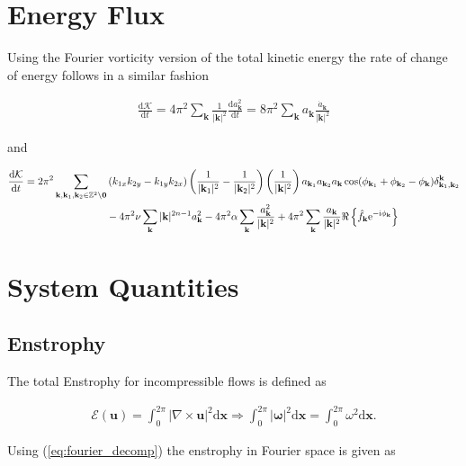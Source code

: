\documentclass[9pt]{article}
\newcommand{\der}[2]{\frac{\mathrm{d}#1}{\mathrm{d}#2}}          	 %
\newcommand{\ii}{\mathrm{i}}      								  %
\newcommand{\e}{\mathrm{e}}      								  %
\newcommand{\curl}[1]{\nabla \times {#1}}								%
\newcommand{\bfu}{\mathbf{u}}											%
\newcommand{\bfx}{\mathbf{x}}								%
\newcommand{\bfk}{\mathbf{k}}								%
\newcommand{\bfkn}[1]{\mathbf{k}_{#1}}								%
\begin{document}
\section{Energy Flux}

Using the Fourier vorticity version of the total kinetic energy the rate of change of energy follows in a similar fashion

\begin{align}
	\der{\mathcal{K}}{t} = 4\pi^2\sum_{\bfk}  \frac{1}{|\bfk|^2}\der{a_\bfk^2}{t} =8\pi^2\sum_{\bfk} a_\bfk \frac{\dot{a}_\bfk}{|\bfk|^2}
\end{align}

and 

\begin{align}
	\der{\mathcal{K}}{t} &= 2\pi^2	\sum_{\bfk, \mathbf{k}_1, \mathbf{k}_2\in \mathbb{Z}^2\setminus \mathbf{0}}\left(k_{1x}k_{2y} - k_{1y}k_{2x}\right) \left(\frac{1}{|\bfkn{1}|^2} - \frac{1}{|\bfkn{2}|^2}\right) \left( \frac{1}{|\bfk|^2}\right)a_{\bfkn{1}} a_{\bfkn{2}} a_{\bfk} \cos(\phi_{\bfkn{1}} + \phi_{\bfkn{2}} - \phi_{\bfk})\delta_{\bfkn{1}, \bfkn{2}}^{\bfk} \notag \\ & \qquad \qquad \qquad \qquad- 4\pi^2\nu \sum_{\bfk}|\bfk|^{2n - 1} a_{\bfk}^2 - 4\pi^2\alpha\sum_{\bfk} \frac{a_\bfk^2}{|\bfk|^2} + 4\pi^2\sum_{\bfk}\frac{a_\bfk}{|\bfk|^2}\Re\left\{\hat{f}_{\bfk} \e^{-\ii\phi_\bfk}\right\}
\end{align}

\section{System Quantities}

\subsection{Enstrophy}

The total Enstrophy for incompressible flows is defined as 

\begin{align}
	\mathcal{E}(\bfu) = \int_{0}^{2\pi} |\curl{\bfu}|^2 \mathrm{d}\bfx \Rightarrow \int_{0}^{2\pi} |\bm{\omega}|^2 \mathrm{d}\bfx = \int_{0}^{2\pi} \omega^2 \mathrm{d}\bfx .
	\label{eq:enstrophy_def}
\end{align}

Using (\ref{eq:fourier_decomp}) the enstrophy in Fourier space is given as 
\end{document}

